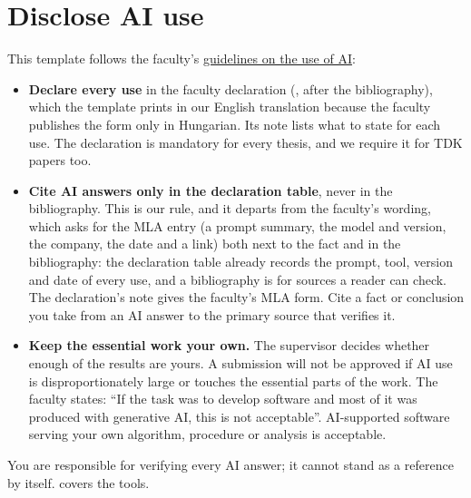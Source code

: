 \section{Disclose AI use}\label{guide:writing:ai}
This template follows the faculty's \href{https://vik.bme.hu/page/1346/}{guidelines on the use of AI}:
\begin{itemize}
  \item \textbf{Declare every use} in the faculty declaration (, after the bibliography), which the template prints in our English translation because the faculty publishes the form only in Hungarian. Its note lists what to state for each use. The declaration is mandatory for every thesis, and we require it for TDK papers too.
  \item \textbf{Cite AI answers only in the declaration table}, never in the bibliography. This is our rule, and it departs from the faculty's wording, which asks for the MLA entry (a prompt summary, the model and version, the company, the date and a link) both next to the fact and in the bibliography: the declaration table already records the prompt, tool, version and date of every use, and a bibliography is for sources a reader can check. The declaration's note gives the faculty's MLA form. Cite a fact or conclusion you take from an AI answer to the primary source that verifies it.
\end{itemize}
\begin{itemize}
  \item \textbf{Keep the essential work your own.} The supervisor decides whether enough of the results are yours. A submission will not be approved if AI use is disproportionately large or touches the essential parts of the work. The faculty states: \enquote{If the task was to develop software and most of it was produced with generative AI, this is not acceptable}. AI-supported software serving your own algorithm, procedure or analysis is acceptable.
\end{itemize}
You are responsible for verifying every AI answer; it cannot stand as a reference by itself.  covers the tools.

